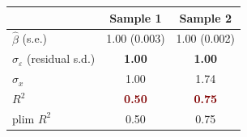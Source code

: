 \begin{tabular}{@{}lcc@{}}
\toprule
 & Sample 1 & Sample 2 \\
\midrule
$\hat\beta$ (s.e.) & 1.00 (0.003) & 1.00 (0.002) \\
$\hat\sigma_\varepsilon$ (residual s.d.) & \textcolor{DeepNavy}{\bfseries 1.00} & \textcolor{DeepNavy}{\bfseries 1.00} \\
$\hat\sigma_x$ & 1.00 & 1.74 \\
\midrule
$R^2$ & \textcolor{Maroon}{\bfseries 0.50} & \textcolor{Maroon}{\bfseries 0.75} \\
plim $R^2$ & 0.50 & 0.75 \\
\bottomrule
\end{tabular}

